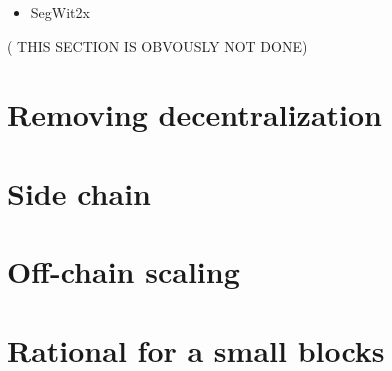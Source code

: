 \begin{itemize}
	\item SegWit2x
\end{itemize} 


( THIS SECTION IS OBVOUSLY NOT DONE) 

\section{Removing decentralization}

\section{Side chain}

\section{Off-chain scaling}

\section{Rational for a small blocks}
